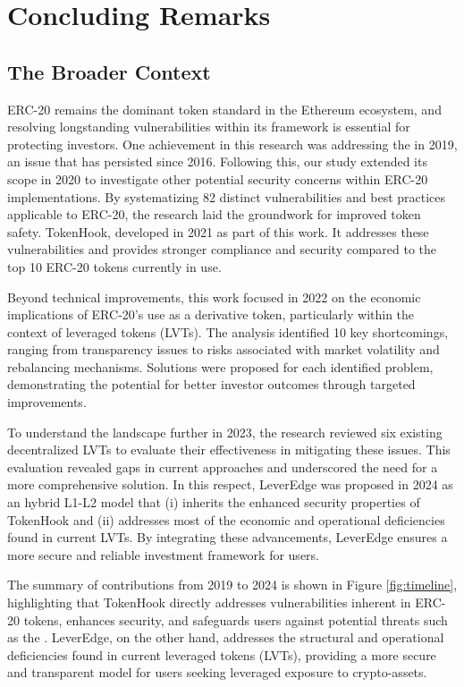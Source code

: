 
\chapter{Concluding Remarks}\label{ch:remarks}

\section{The Broader Context}
ERC-20 remains the dominant token standard in the Ethereum ecosystem, and resolving longstanding vulnerabilities within its framework is essential for protecting investors. One achievement in this research was addressing the \mwa in 2019, an issue that has persisted since 2016. Following this, our study extended its scope in 2020 to investigate other potential security concerns within ERC-20 implementations. By systematizing 82 distinct vulnerabilities and best practices applicable to ERC-20, the research laid the groundwork for improved token safety. TokenHook, developed in 2021 as part of this work. It addresses these vulnerabilities and provides stronger compliance and security compared to the top 10 ERC-20 tokens currently in use.

Beyond technical improvements, this work focused in 2022 on the economic implications of ERC-20's use as a derivative token, particularly within the context of leveraged tokens (LVTs). The analysis identified 10 key shortcomings, ranging from transparency issues to risks associated with market volatility and rebalancing mechanisms. Solutions were proposed for each identified problem, demonstrating the potential for better investor outcomes through targeted improvements.

To understand the landscape further in 2023, the research reviewed six existing decentralized LVTs to evaluate their effectiveness in mitigating these issues. This evaluation revealed gaps in current approaches and underscored the need for a more comprehensive solution. In this respect, LeverEdge was proposed in 2024 as an hybrid L1-L2 model that (i) inherits the enhanced security properties of TokenHook and (ii) addresses most of the economic and operational deficiencies found in current LVTs. By integrating these advancements, LeverEdge ensures a more secure and reliable investment framework for users.

The summary of contributions from 2019 to 2024 is shown in Figure \ref{fig:timeline}, highlighting that TokenHook directly addresses vulnerabilities inherent in ERC-20 tokens, enhances security, and safeguards users against potential threats such as the \mwa. LeverEdge, on the other hand, addresses the structural and operational deficiencies found in current leveraged tokens (LVTs), providing a more secure and transparent model for users seeking leveraged exposure to crypto-assets.

